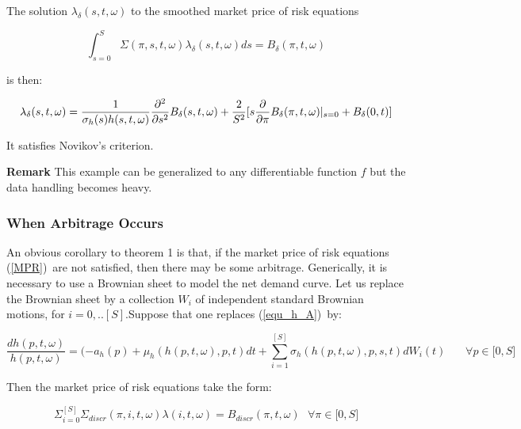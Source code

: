 \documentclass{article}
\begin{document}
The solution $\lambda _{\delta }(s,t,\omega )$ to the smoothed market price
of risk equations

\begin{equation*}
\int_{s=0}^{S}\Sigma (\pi ,s,t,\omega )\lambda _{\delta }(s,t,\omega
)ds=B_{\delta }(\pi ,t,\omega )
\end{equation*}%
\bigskip

is then:

\begin{equation*}
\lambda _{\delta }(s,t,\omega )=\frac{1}{\sigma _{h}(s)h(s,t,\omega )}\frac{%
\partial ^{2}}{\partial s^{2}}B_{\delta }(s,t,\omega )+\frac{2}{S^{2}}[s%
\frac{\partial }{\partial \pi }B_{\delta }(\pi ,t,\omega )|_{s=0}+B_{\delta
}(0,t)]
\end{equation*}

It satisfies Novikov's criterion.

\bigskip

\textbf{Remark} This example can be generalized to any differentiable
function $f$ but the data handling becomes heavy.

\bigskip

\subsubsection{When Arbitrage Occurs}

An obvious corollary to theorem 1 is that, if the market price of risk
equations (\ref{MPR})\ are not satisfied, then there may be some arbitrage.
Generically, it is necessary to use a Brownian sheet to model the net demand
curve. Let us replace the Brownian sheet by a collection $W_{i}$ of
independent standard Brownian motions, for $i=0,..[S].$Suppose that one
replaces (\ref{equ_h_A})\ by:

\begin{equation*}
\frac{dh(p,t,\omega )}{h(p,t,\omega )}=(-a_{h}(p)+\mu _{h}(h(p,t,\omega
),p,t)dt+\sum_{i=1}^{[S]}\sigma _{h}(h(p,t,\omega ),p,s,t)dW_{i}(t)\ \ \ \ \
\ \ \ \forall p\in \lbrack 0,S]
\end{equation*}

Then the market price of risk equations take the form:

\begin{equation}
\Sigma _{i=0}^{[S]}\Sigma _{discr}(\pi ,i,t,\omega )\lambda (i,t,\omega
)=B_{discr}(\pi ,t,\omega )\text{ \ \ }\forall \pi \in \lbrack 0,S]
\label{systnotsoluble}
\end{equation}
\end{document}
